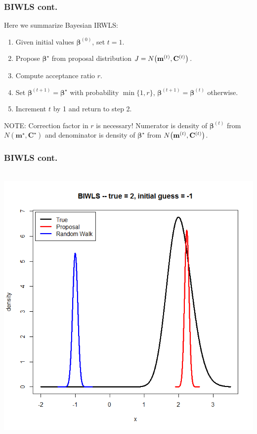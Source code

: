 \documentclass[black]{beamer}
\begin{document}
\begin{frame}
\frametitle{BIWLS cont.}
Here we summarize Bayesian IRWLS:
\vspace{0.2in}
\begin{enumerate}
\item Given initial values $\boldsymbol\beta^{(0)}$, set $t = 1$.
\vspace{0.2cm}
\item Propose $\boldsymbol\beta^\star$ from proposal distribution $J = N\big{(}{\bf m}^{(t)}, {\bf C}^{(t)}\big{)}$.
\vspace{0.2cm}
\item Compute acceptance ratio $r$.
\vspace{0.2cm}
\item Set $\boldsymbol\beta^{(t+1)} = \boldsymbol\beta^\star$ with probability $\min\{1,r\}$, $\boldsymbol\beta^{(t+1)} = \boldsymbol\beta^{(t)}$ otherwise. 
\item Increment $t$ by 1 and return to step 2.
\end{enumerate}
\vspace{0.2cm}
NOTE: Correction factor in $r$ is necessary! Numerator is density of $\bm\beta^{(t)}$ from $N(\mathbf{m}^\star,\mathbf{C}^\star)$ and denominator is density of $\bm\beta^\star$ from $N\big{(}\mathbf{m}^{(t)},\mathbf{C}^{(t)}\big{)}$.
\end{frame}

\begin{frame}
\frametitle{BIWLS cont.}
~~~~~~~~ \includegraphics[scale=.35]{BIWLSgraph.png}
\end{frame}
\end{document}
